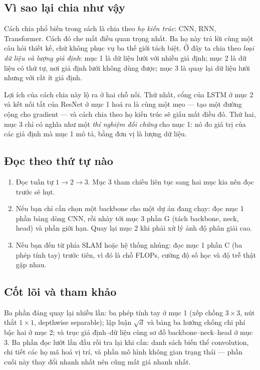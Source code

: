 \documentclass[../../deep_learning.tex]{subfiles}
\begin{document}
\subsection*{Vì sao lại chia như vậy}
Cách chia phổ biến trong sách là chia theo \emph{họ kiến trúc}: CNN, RNN, Transformer. Cách đó che mất điều quan trọng nhất. Ba họ này trả lời cùng một câu hỏi thiết kế, chứ không phục vụ ba thế giới tách biệt. Ở đây ta chia theo \emph{loại dữ liệu và lượng giả định}: mục 1 là dữ liệu lưới với nhiều giả định; mục 2 là dữ liệu có thứ tự, nơi giả định lưới không dùng được; mục 3 là quay lại dữ liệu lưới nhưng với rất ít giả định.

Lợi ích của cách chia này lộ ra ở hai chỗ nối. Thứ nhất, cổng của LSTM ở mục 2 và kết nối tắt của ResNet ở mục 1 hoá ra là cùng một mẹo --- tạo một đường cộng cho gradient --- và cách chia theo họ kiến trúc sẽ giấu mất điều đó. Thứ hai, mục 3 chỉ có nghĩa như một \emph{thí nghiệm đối chứng} cho mục 1: nó đo giá trị của các giả định mà mục 1 mô tả, bằng đơn vị là lượng dữ liệu.

\subsection*{Đọc theo thứ tự nào}
\begin{enumerate}
\item Đọc tuần tự \(1 \rightarrow 2 \rightarrow 3\). Mục 3 tham chiếu liên tục sang hai mục kia nên đọc trước sẽ hụt.
\item Nếu bạn chỉ cần chọn một backbone cho một dự án đang chạy: đọc mục 1 phần bảng dòng CNN, rồi nhảy tới mục 3 phần G (tách backbone, neck, head) và phần giới hạn. Quay lại mục 2 khi phải xử lý ảnh độ phân giải cao.
\item Nếu bạn đến từ phía SLAM hoặc hệ thống nhúng: đọc mục 1 phần C (ba phép tính tay) trước tiên, vì đó là chỗ FLOPs, cường độ số học và độ trễ thật gặp nhau.
\end{enumerate}

\subsection*{Cốt lõi và tham khảo}
Ba phần đáng quay lại nhiều lần: ba phép tính tay ở mục 1 (xếp chồng \(3\times3\), nút thắt \(1\times1\), depthwise separable); lập luận \(\sqrt{d}\) và bảng ba hướng chống chi phí bậc hai ở mục 2; và trục giả định--dữ liệu cùng sơ đồ backbone--neck--head ở mục 3. Ba phần đọc lướt lần đầu rồi tra lại khi cần: danh sách biến thể convolution, chi tiết các họ mã hoá vị trí, và phần mô hình không gian trạng thái --- phần cuối này thay đổi nhanh nhất nên cũng mất giá nhanh nhất.
\end{document}
